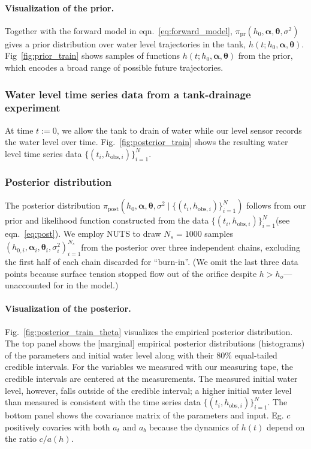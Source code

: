 \documentclass[openacc]{rsproca_new}%
\newcommand\thedata {$\{(t_i,h_{\text{obs}, i})\}_{i=1}^{N}$\xspace}
\newcommand\thedatanomath {\{(t_i,h_{\text{obs}, i})\}_{i=1}^{N}}
\newcommand\themodel {$h(t; h_0, \boldsymbol \alpha, \boldsymbol\theta)$\xspace}
\newcommand\thesamples{$(h_{0, i}, \boldsymbol \alpha_i, \boldsymbol \theta_i, \sigma_i^2)_{i=1}^{N_s}$}
\begin{document}
\paragraph{Visualization of the prior.}
Together with the forward model in eqn.~\ref{eq:forward_model}, $\pi_{\text{pr}}(h_0, \boldsymbol \alpha, \boldsymbol \theta, \sigma^2)$ gives a prior distribution over water level trajectories in the tank, \themodel. 
Fig~\ref{fig:prior_train} shows samples of functions \themodel from the prior, which encodes a broad range of possible future trajectories. 

\subsubsection{Water level time series data from a tank-drainage experiment} At time $t:=0$, we allow the tank to drain of water while our level sensor records the water level over time. 
Fig.~\ref{fig:posterior_train} shows the resulting water level time series data \thedata.

\subsubsection{Posterior distribution}
The posterior distribution $\pi_{\text{post}}(h_0, \boldsymbol \alpha, \boldsymbol \theta, \sigma^2 \mid \thedatanomath)$ follows from our prior and likelihood function constructed from the data \thedata (see eqn.~\ref{eq:post}). 
We employ NUTS to draw $N_s=1000$ samples \thesamples from the posterior over three independent chains, excluding the first half of each chain discarded for ``burn-in''. 
(We omit the last three data points because surface tension stopped flow out of the orifice despite $h>h_o$---unaccounted for in the model.)


\paragraph{Visualization of the posterior.}Fig.~\ref{fig:posterior_train_theta} visualizes the empirical posterior distribution. 
The top panel shows the [marginal] empirical posterior distributions (histograms) of the parameters and initial water level along with their 80\% equal-tailed credible intervals. 
For the variables we measured with our measuring tape, the credible intervals are centered at the measurements. 
The measured initial water level, however, falls outside of the credible interval; a higher initial water level than measured is consistent with the time series data \thedata.
The bottom panel shows the covariance matrix of the parameters and input. Eg. $c$ positively covaries with both $a_t$ and $a_b$ because the dynamics of $h(t)$ depend on the ratio $c/a(h)$.
\end{document}
